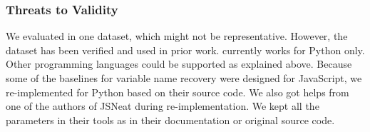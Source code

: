 \vspace{-8pt}
\subsubsection{Threats to Validity}
\label{sec:threats}

We evaluated in one dataset, which might not be
representative. However, the dataset has been verified and used in
prior work. {\tool} currently works for Python only. Other programming
languages could be supported as explained above.
%
Because some of the baselines for variable name recovery were designed
for JavaScript, we re-implemented for Python based on their source code. We also
got helps from one of the authors of JSNeat during
re-implementation. We kept all the parameters in their tools as in
their documentation or original source code.


